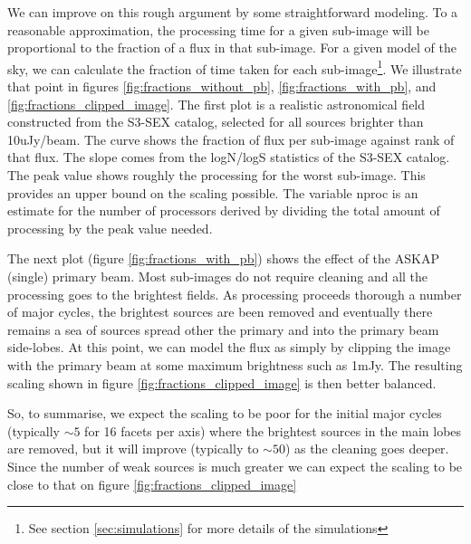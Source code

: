 \documentclass[11pt,a4paper,variablewidth]{article}
\begin{document}
We can improve on this rough argument by some straightforward modeling. To a reasonable approximation, the processing time for a given sub-image will be proportional to the fraction of a flux in that sub-image. For a given model of the sky, we can calculate the fraction of time taken for each sub-image\footnote{See section \ref{sec:simulations} for more details of the simulations}. We illustrate that point in figures \ref{fig:fractions_without_pb}, \ref{fig:fractions_with_pb}, and \ref{fig:fractions_clipped_image}. The first plot is a realistic astronomical field constructed from the S3-SEX catalog, selected for all sources brighter than 10uJy/beam. The curve shows the fraction of flux per sub-image against rank of that flux. The slope comes from the logN/logS statistics of the S3-SEX catalog. The peak value shows roughly the processing for the worst sub-image. This provides an upper bound on the scaling possible. The variable nproc is an estimate for the number of processors derived by dividing the total amount of processing by the peak value needed.

The next plot (figure \ref{fig:fractions_with_pb}) shows the effect of the ASKAP (single) primary beam. Most sub-images do not require cleaning and all the processing goes to the brightest fields. As processing proceeds thorough a number of major cycles, the brightest sources are been removed and eventually there remains a sea of sources spread other the primary and into the primary beam side-lobes. At this point, we can model the flux as simply by clipping the image with the primary beam at some maximum brightness such as 1mJy. The resulting scaling shown in figure \ref{fig:fractions_clipped_image} is then better balanced.

So, to summarise, we expect the scaling to be poor for the initial major cycles (typically $\sim 5$ for 16 facets per axis) where the brightest sources in the main lobes are removed, but it will improve (typically to $\sim 50$) as the cleaning goes deeper. Since the number of weak sources is much greater we can expect the scaling to be close to that on figure \ref{fig:fractions_clipped_image}
\end{document}
